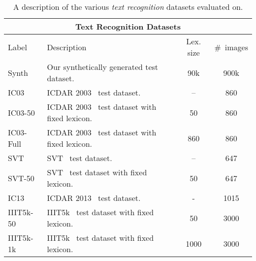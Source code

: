 \documentclass[twocolumn]{svjour3}          \smartqed  \usepackage{epsfig}
\begin{document}
\begin{table*}[t]
\begin{center}\footnotesize
\begin{tabular}{|l|l|c|c|} \hline
\multicolumn{4}{|c|}{\bf Text Recognition Datasets}\\
\hline
Label & {\centering\footnotesize Description} & Lex. size & \#~images\\
\hline\hline
Synth        & {Our synthetically generated test dataset.} & 90k & 900k\\
\hline
IC03        & {ICDAR 2003~\cite{icdar2003dataset} test dataset.} & -- & 860\\
\hline
IC03-50     & {ICDAR 2003~\cite{icdar2003dataset} test dataset with fixed lexicon.} & 50 & 860\\
\hline
IC03-Full   & {ICDAR 2003~\cite{icdar2003dataset} test dataset with fixed lexicon.} & 860 & 860\\
\hline
SVT         & {SVT~\cite{Wang10} test dataset.} & -- & 647\\
\hline
SVT-50      & {SVT~\cite{Wang10} test dataset with fixed lexicon.} & 50 & 647\\
\hline
IC13      & {ICDAR 2013~\cite{ICDAR2013} test dataset.} & - & 1015\\
\hline
IIIT5k-50         & {IIIT5k~\cite{Mishra12} test dataset with fixed lexicon.} & 50& 3000\\
\hline
IIIT5k-1k      & {IIIT5k~\cite{Mishra12} test dataset with fixed lexicon.} & 1000 & 3000\\
\hline
\end{tabular}
\end{center}\vspace{-1em}
\caption{\small A description of the various \emph{text recognition} datasets evaluated on.}
\label{table:evalrecog}
\end{table*}
\end{document}
